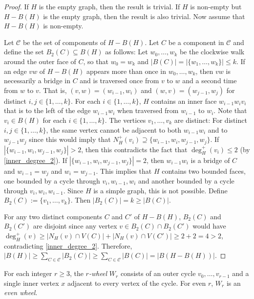 \documentclass{patmorin}
\newcommand{\defin}[1]{\emph{\textcolor{brightmaroon}{#1}}}
\begin{document}
\begin{proof}
  If $H$ is the empty graph, then the result is trivial. If $H$ is non-empty but $H-B(H)$ is the empty graph, then the result is also trivial. Now assume that $H-B(H)$ is non-empty.

  Let $\mathcal{C}$ be the set of components of $H-B(H)$.
  Let $C$ be a component in $\mathcal{C}$ and define the set $B_2(C)\subseteq B(H)$ as follows: Let $w_0,\ldots,w_k$ be the clockwise walk around the outer face of $C$, so that $w_0=w_k$ and $|B(C)|=|\{w_1,\ldots,w_k\}|\le k$.  If an edge $vw$ of $H-B(H)$ appears more than once in $w_0,\ldots,w_k$, then $vw$ is necessarily a bridge in $C$ and is traversed once from $v$ to $w$ and a second time from $w$ to $v$. That is, $(v,w)=(w_{i-1},w_{i})$ and $(w,v)=(w_{j-1},w_{j})$ for distinct $i,j\in\{1,\ldots,k\}$. For each $i\in\{1,\ldots,k\}$, $H$ contains an inner face $w_{i-1}w_iv_i$ that is to the left of the edge $w_{i-1}w_i$ when traversed from $w_{i-1}$ to $w_i$.  Note that $v_i\in B(H)$ for each $i\in\{1,\ldots,k\}$. The vertices $v_1,\ldots,v_k$ are distinct: For distinct $i,j\in\{1,\ldots,k\}$, the same vertex cannot be adjacent to both $w_{i-1}w_{i}$ and to $w_{j-1}w_{j}$ since this would imply that $N^+_H(v_i)\supseteq\{w_{i-1},w_{i},w_{j-1},w_{j}\}$.  If $|\{w_{i-1},w_{i},w_{j-1},w_{j}\}|>2$, then this contradicts the fact that $\deg^+_H(v_i)\le 2$ (by \ref{inner_degree_2}).  If $|\{w_{i-1},w_{i},w_{j-1},w_{j}\}|=2$, then $w_{i-1}w_i$ is a bridge of $C$ and $w_{i-1}=w_{j}$ and $w_{i}=w_{j-1}$.  This implies that $H$ contains two bounded faces, one bounded by a cycle through $v_i,w_{i-1},w_i$ and another bounded by a cycle through $v_i,w_i,w_{i-1}$.  Since $H$ is a simple graph, this is not possible.  Define $B_2(C):=\{v_1,\ldots,v_k\}$.  Then $|B_2(C)|= k\ge |B(C)|$. 
  
  For any two distinct components $C$ and $C'$ of $H-B(H)$, $B_2(C)$ and $B_2(C')$ are disjoint since any vertex $v\in B_2(C)\cap B_2(C')$ would have $\deg^+_H(v)\ge|N_H(v)\cap V(C)|+|N_H(v)\cap V(C')|\ge 2+2 = 4 > 2$, contradicting \ref{inner_degree_2}.  Therefore, $|B(H)|\ge \sum_{C\in\mathcal{C}} |B_2(C)|\ge \sum_{C\in\mathcal{C}} |B(C)|=|B(H-B(H))|$.
\end{proof}

For each integer $r\ge 3$, the \defin{$r$-wheel} $W_r$ consists of an outer cycle $v_0,\ldots,v_{r-1}$ and a single inner vertex $x$ adjacent to every vertex of the cycle. For even $r$, $W_r$ is an \defin{even wheel}.
\end{document}
